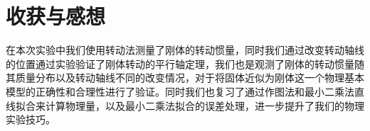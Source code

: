 \documentclass[a4 paper,12pt]{article}
\begin{document}
\section{收获与感想}
在本次实验中我们使用转动法测量了刚体的转动惯量，同时我们通过改变转动轴线的位置通过实验验证了刚体转动的平行轴定理，我们也是观测了刚体的转动惯量随其质量分布以及转动轴线不同的改变情况，对于将固体近似为刚体这一个物理基本模型的正确性和合理性进行了验证。同时我们也复习了通过作图法和最小二乘法直线拟合来计算物理量，以及最小二乘法拟合的误差处理，进一步提升了我们的物理实验技巧。
\end{document}
